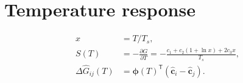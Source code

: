 \documentclass{article}
\begin{document}
\section*{Temperature response}
\[
\begin{aligned}
x&=T/T_s,\\
S(T)&=-\frac{\partial G}{\partial T}=-\frac{c_1+c_2(1+\ln x)+2c_3x}{T_s},\\
\Delta\widehat G_{ij}(T)&=\boldsymbol\phi(T)^{\mathsf T}(\widehat{\mathbf c}_i-\widehat{\mathbf c}_j).
\end{aligned}
\]
\end{document}
